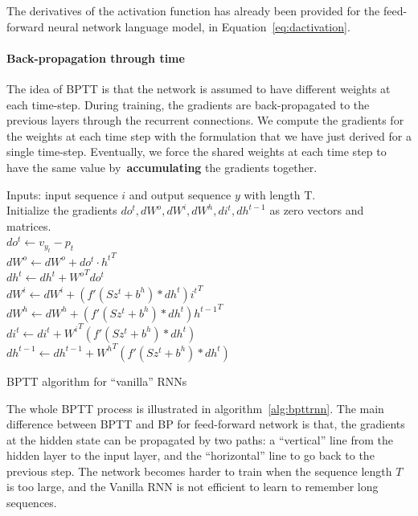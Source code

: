 The derivatives of the activation function has already been provided for the feed-forward neural network language model, in Equation~\ref{eq:dactivation}. 


\paragraph{Back-propagation through time} The idea of BPTT is that the network is assumed to have different weights at each time-step. During training, the gradients are back-propagated to the previous layers through the recurrent connections. We compute the gradients for the weights at each time step with the formulation that we have just derived for a single time-step. Eventually, we force the shared weights at each time step to have the same value by~\textbf{accumulating} the gradients together. 

\begin{algorithm}
	
	Inputs: input sequence $i$ and output sequence $y$ with length T. \\
	Initialize the gradients $do^t,dW^o,dW^i,dW^h,di^t,dh^{t-1}$ as zero vectors and matrices. \\
	{
		$do^t \leftarrow v_{y_t} - p_t$
		\\ 
		$dW^o \leftarrow dW^o + do^t \cdot {h^t}^T$ \\
%		
		$dh^t \leftarrow dh^t + {W^o}^T do^t$
		\\
		$dW^i \leftarrow dW^i + (f'(Sz^t + b^h) * dh^t) {i^t}^T $\\
		
		$dW^h \leftarrow dW^h + (f'(Sz^t + b^h) * dh^t) {h^{t-1}}^T$ \\
		
	
		$di^t \leftarrow di^t + {W^i}^T (f'(Sz^t + b^h) * dh^t)$ \\
		$dh^{t-1} \leftarrow dh^{t-1} + {W^h}^T (f'(Sz^t + b^h) * dh^t)$ \\

	}
	\caption{BPTT algorithm for ``vanilla'' RNNs}
	\label{alg:bpttrnn}
\end{algorithm}

The whole BPTT process is illustrated in algorithm~\ref{alg:bpttrnn}. The main difference between BPTT and BP for feed-forward network is that, the gradients at the hidden state can be propagated by two paths: a ``vertical'' line from the hidden layer to the input layer, and the ``horizontal'' line to go back to the previous step. The network becomes harder to train when the sequence length $T$ is too large, and the Vanilla RNN is not efficient to learn to remember long sequences.

